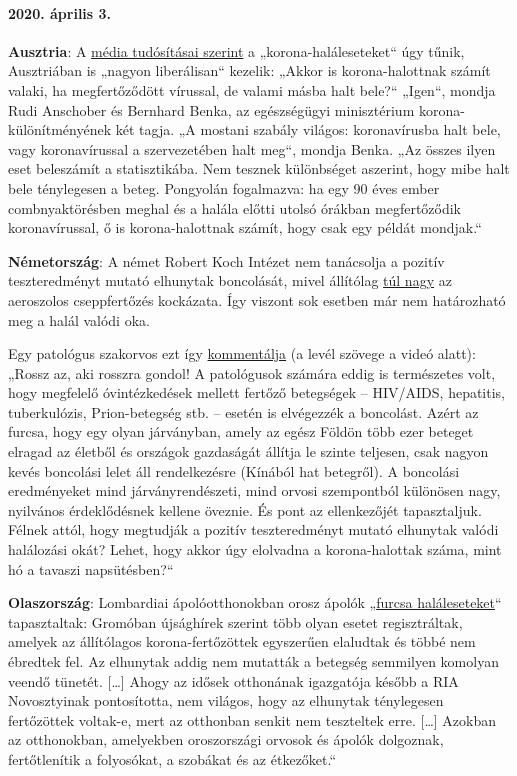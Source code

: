 \hypertarget{2020-uxe1prilis-3}{%
\paragraph{2020. április 3.}\label{2020-uxe1prilis-3}}

\textbf{Ausztria}: A
\href{https://www.heute.at/s/osterreich-bei-corona-todesstatistik-sehr-liberal-48665863}{média
tudósításai szerint} a „korona-haláleseteket`` úgy tűnik, Ausztriában is
„nagyon liberálisan`` kezelik: „Akkor is korona-halottnak számít valaki,
ha megfertőződött vírussal, de valami másba halt bele?`` „Igen``, mondja
Rudi Anschober és Bernhard Benka, az egészségügyi minisztérium
korona-különítményének két tagja. „A mostani szabály világos:
koronavírusba halt bele, vagy koronavírussal a szervezetében halt meg``,
mondja Benka. „Az összes ilyen eset beleszámít a statisztikába. Nem
tesznek különbséget aszerint, hogy mibe halt bele ténylegesen a beteg.
Pongyolán fogalmazva: ha egy 90 éves ember combnyaktörésben meghal és a
halála előtti utolsó órákban megfertőződik koronavírussal, ő is
korona-halottnak számít, hogy csak egy példát mondjak.``

\textbf{Németország}: A német Robert Koch Intézet nem tanácsolja a
pozitív teszteredményt mutató elhunytak boncolását, mivel állítólag
\href{https://www.youtube.com/watch?v=gSn_YaOYYcY}{túl nagy} az
aeroszolos cseppfertőzés kockázata. Így viszont sok esetben már nem
határozható meg a halál valódi oka.

Egy patológus szakorvos ezt így
\href{https://www.youtube.com/watch?v=gSn_YaOYYcY}{kommentálja} (a levél
szövege a videó alatt): „Rossz az, aki rosszra gondol! A patológusok
számára eddig is természetes volt, hogy megfelelő óvintézkedések mellett
fertőző betegségek -- HIV/AIDS, hepatitis, tuberkulózis, Prion-betegség
stb. -- esetén is elvégezzék a boncolást. Azért az furcsa, hogy egy
olyan járványban, amely az egész Földön több ezer beteget elragad az
életből és országok gazdaságát állítja le szinte teljesen, csak nagyon
kevés boncolási lelet áll rendelkezésre (Kínából hat betegről). A
boncolási eredményeket mind járványrendészeti, mind orvosi szempontból
különösen nagy, nyilvános érdeklődésnek kellene öveznie. És pont az
ellenkezőjét tapasztaljuk. Félnek attól, hogy megtudják a pozitív
teszteredményt mutató elhunytak valódi halálozási okát? Lehet, hogy
akkor úgy elolvadna a korona-halottak száma, mint hó a tavaszi
napsütésben?``

\textbf{Olaszország}: Lombardiai ápolóotthonokban orosz ápolók
„\href{https://de.sputniknews.com/panorama/20200402326767475-fachpersonal-todesfaelle-lombardei-zeitung/}{furcsa
haláleseteket}`` tapasztaltak: Gromóban újsághírek szerint több olyan
esetet regisztráltak, amelyek az állítólagos korona-fertőzöttek
egyszerűen elaludtak és többé nem ébredtek fel. Az elhunytak addig nem
mutatták a betegség semmilyen komolyan veendő tünetét. {[}\ldots{}{]}
Ahogy az idősek otthonának igazgatója később a RIA Novosztyinak
pontosította, nem világos, hogy az elhunytak ténylegesen fertőzöttek
voltak-e, mert az otthonban senkit nem teszteltek erre. {[}\ldots{}{]}
Azokban az otthonokban, amelyekben oroszországi orvosok és ápolók
dolgoznak, fertőtlenítik a folyosókat, a szobákat és az étkezőket.``

